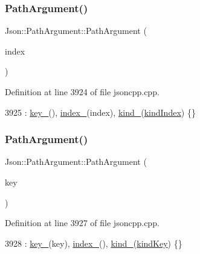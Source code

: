 \subsubsection{\texorpdfstring{Path\+Argument()}{PathArgument()}\hspace{0.1cm}{\footnotesize\ttfamily [2/4]}}
{\footnotesize\ttfamily Json\+::\+Path\+Argument\+::\+Path\+Argument (\begin{DoxyParamCaption}\item[{\hyperlink{namespace_json_a8048e741f2177c3b5d9ede4a5b8c53c2}{Array\+Index}}]{index }\end{DoxyParamCaption})}



Definition at line 3924 of file jsoncpp.\+cpp.


\begin{DoxyCode}
3925     : \hyperlink{class_json_1_1_path_argument_af4024368548ff730ef2bed97d6f1ca43}{key\_}(), \hyperlink{class_json_1_1_path_argument_afd5857d1b6bfaae6961333bdae7bd5ec}{index\_}(index), \hyperlink{class_json_1_1_path_argument_ad4bc4b544b155a3d9c7788572ecf991b}{kind\_}(\hyperlink{class_json_1_1_path_argument_a2420bbad778573c147e578701b84d9b9ae5a976b898111903334cb131f5e03dc4}{kindIndex}) \{\}
\end{DoxyCode}
\mbox{\label{class_json_1_1_path_argument_a9690417a8a40e6e49f2acdf6c9281345}} 
\subsubsection{\texorpdfstring{Path\+Argument()}{PathArgument()}\hspace{0.1cm}{\footnotesize\ttfamily [3/4]}}
{\footnotesize\ttfamily Json\+::\+Path\+Argument\+::\+Path\+Argument (\begin{DoxyParamCaption}\item[{const char $\ast$}]{key }\end{DoxyParamCaption})}



Definition at line 3927 of file jsoncpp.\+cpp.


\begin{DoxyCode}
3928     : \hyperlink{class_json_1_1_path_argument_af4024368548ff730ef2bed97d6f1ca43}{key\_}(key), \hyperlink{class_json_1_1_path_argument_afd5857d1b6bfaae6961333bdae7bd5ec}{index\_}(), \hyperlink{class_json_1_1_path_argument_ad4bc4b544b155a3d9c7788572ecf991b}{kind\_}(\hyperlink{class_json_1_1_path_argument_a2420bbad778573c147e578701b84d9b9a74f5968d06c01701b7a46092c33ba7d1}{kindKey}) \{\}
\end{DoxyCode}
\mbox{\label{class_json_1_1_path_argument_ac15f25452124fbf21218897113015301}} 
